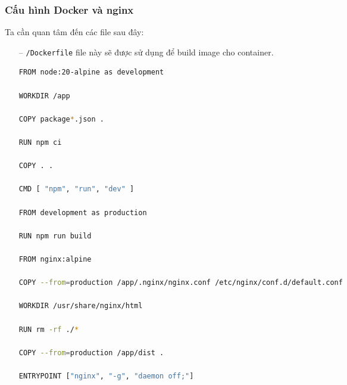 \documentclass[a4paper, 11pt]{article}
\begin{document}
\subsubsection{Cấu hình Docker và nginx}
Ta cần quan tâm đến các file sau đây:
\begin{itemize}
    \item [--] \texttt{/Dockerfile} file này sẽ được sử dụng để build image cho container. \hfill
          \begin{lstlisting}[language=bash, caption={Nội dung file \texttt{/Dockerfile}}]
FROM node:20-alpine as development

WORKDIR /app

COPY package*.json .

RUN npm ci

COPY . .

CMD [ "npm", "run", "dev" ]

FROM development as production

RUN npm run build

FROM nginx:alpine

COPY --from=production /app/.nginx/nginx.conf /etc/nginx/conf.d/default.conf

WORKDIR /usr/share/nginx/html

RUN rm -rf ./*

COPY --from=production /app/dist .

ENTRYPOINT ["nginx", "-g", "daemon off;"]
\end{lstlisting}


\end{itemize}
\end{document}
